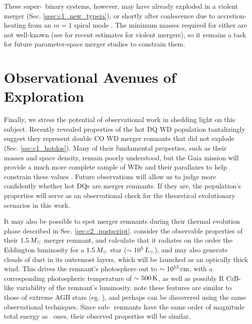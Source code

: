 These super-\Mch\ binary systems, however, may have already exploded in a violent merger (Sec. \ref{ssec:c1_new_typeia}), or shortly after coalescence due to accretion-heating from an $m = 1$ spiral mode \citep{kash+15}.  The minimum masses required for either are not well-known (see \citealt{dan+12, sato+16} for recent estimates for violent mergers), so it remains a task for future parameter-space merger studies to constrain them.
 
\section{Observational Avenues of Exploration}

Finally, we stress the potential of observational work in shedding light on this subject.  Recently revealed properties of the hot DQ WD population tantalizingly suggest they represent double CO WD merger remnants that did not explode (Sec. \ref{sec:c1_hotdqs}).  Many of their fundamental properties, such as their masses and space density, remain poorly understood, but the Gaia mission will provide a much more complete sample of WDs and their parallaxes to help constrain these values \citep{dunl15thesis}.  Future observations will allow us to judge more confidently whether hot DQs are merger remnants.  If they are, the population's properties will serve as an observational check for the theoretical evolutionary scenarios in this work.

It may also be possible to spot merger remnants during their thermal evolution phase described in Sec. \ref{sec:c2_postscript}.  \cite{schw+16} consider the observable properties of their $1.5\,\Msun$ merger remnant, and calculate that it radiates on the order the Eddington luminosity for a $1.5\,\Msun$ star ($\sim10^5\,\Lsun$), and may also generate clouds of dust in its outermost layers, which will be launched as an optically thick wind.  This drives the remnant's photosphere out to $\sim10^{15}\,\mathrm{cm}$, with a corresponding photospheric temperature of $\sim500\,\mathrm{K}$, as well as possibly R CrB-like variability of the remnant's luminosity.  \cite{schw+16} note these features are similar to those of extreme AGB stars (eg. \citealt{blum+06}), and perhaps can be discovered using the same observational techniques.  Since sub-\Mch\ remnants have the same order of magnitude total energy as \Mch\ ones, their observed properties will be similar.

